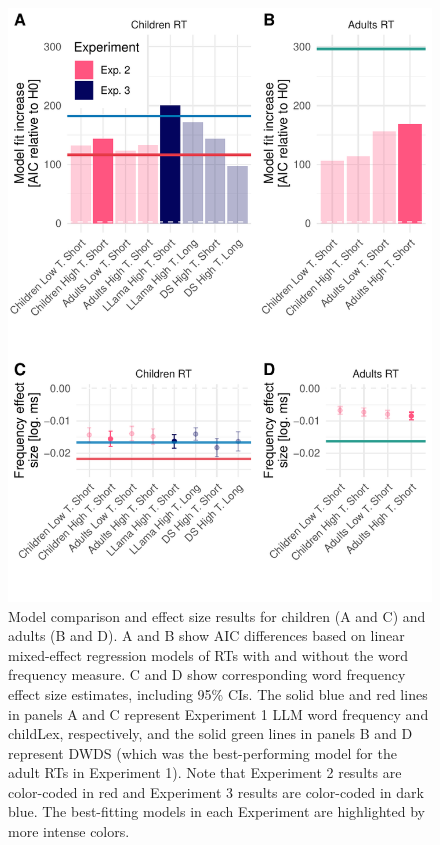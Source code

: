 \documentclass[doc, a4paper, anonymous]{apa7}
\begin{document}
\begin{figure}[!htbp]
  \centerline{
    \includegraphics[width=.8\textwidth]{figures/fig8_r2_age_sep.pdf}}
    \caption{Model comparison and effect size results for children (A and C) and adults (B and D). A and B show AIC differences based on linear mixed-effect regression models of RTs with and without the word frequency measure. C and D show corresponding word frequency effect size estimates, including 95\% CIs. The solid blue and red lines in panels A and C represent Experiment 1 LLM word frequency and childLex, respectively, and the solid green lines in panels B and D represent DWDS (which was the best-performing model for the adult RTs in Experiment 1). Note that Experiment 2 results are color-coded in red and Experiment 3 results are color-coded in dark blue. The best-fitting models in each Experiment are highlighted by more intense colors.}
    \label{fig:modelcomprt2}
\end{figure}
\end{document}
